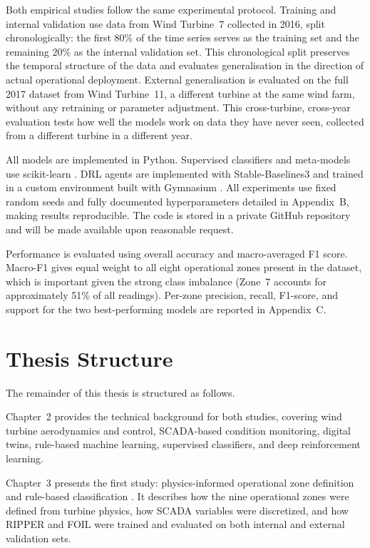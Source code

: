 Both empirical studies follow the same experimental protocol. Training and internal
validation use data from Wind Turbine~7 collected in 2016, split chronologically: the
first 80\% of the time series serves as the training set and the remaining 20\% as the
internal validation set. This chronological split preserves the temporal structure of the
data and evaluates generalisation in the direction of actual operational deployment.
External generalisation is evaluated on the full 2017 dataset from Wind Turbine~11, a
different turbine at the same wind farm, without any retraining or parameter adjustment.
This cross-turbine, cross-year evaluation tests how well the models work on data they
have never seen, collected from a different turbine in a different year.

All models are implemented in Python. Supervised classifiers and meta-models use
scikit-learn \citep{pedregosa2011}. DRL agents are implemented with Stable-Baselines3
\citep{raffin2021} and trained in a custom environment built with Gymnasium
\citep{towers2023}. All experiments use fixed random seeds and fully documented
hyperparameters detailed in Appendix~B, making results reproducible. The code is stored
in a private GitHub repository and will be made available upon reasonable request.

Performance is evaluated using overall accuracy and macro-averaged F1 score. Macro-F1
gives equal weight to all eight operational zones present in the dataset, which is
important given the strong class imbalance (Zone~7 accounts for approximately 51\% of
all readings). Per-zone precision, recall, F1-score, and support for the two
best-performing models are reported in Appendix~C.

\section{Thesis Structure}
\label{sec:intro:structure}

The remainder of this thesis is structured as follows.

Chapter~2 provides the technical background for both studies, covering wind turbine
aerodynamics and control, SCADA-based condition monitoring, digital twins, rule-based
machine learning, supervised classifiers, and deep reinforcement learning.

Chapter~3 presents the first study: physics-informed operational zone definition and
rule-based classification \citep{indrekvam2026}. It describes how the nine operational
zones were defined from turbine physics, how SCADA variables were discretized, and how
RIPPER and FOIL were trained and evaluated on both internal and external validation sets.

